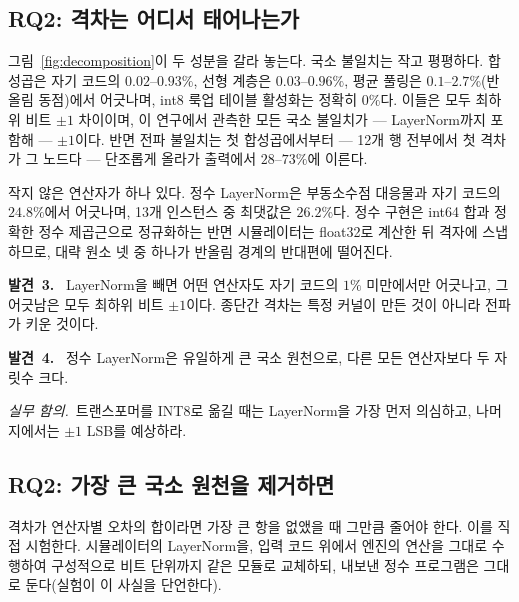 \documentclass[journal]{IEEEtran}
\newcommand{\finding}[1]{\smallskip\noindent\textbf{발견~#1.}~}
\newcommand{\implication}{\emph{실무 함의.}~}
\begin{document}
\subsection{RQ2: 격차는 어디서 태어나는가}
그림~\ref{fig:decomposition}이 두 성분을 갈라 놓는다. 국소 불일치는 작고 평평하다. 합성곱은 자기 코드의
$0.02$--$0.93\%$, 선형 계층은 $0.03$--$0.96\%$, 평균 풀링은 $0.1$--$2.7\%$(반올림 동점)에서 어긋나며, int8 룩업
테이블 활성화는 정확히 $0\%$다. 이들은 모두 최하위 비트 $\pm 1$ 차이이며, 이 연구에서 관측한 모든 국소 불일치가 --- LayerNorm까지
포함해 --- $\pm 1$이다. 반면 전파 불일치는 첫
합성곱에서부터 --- 12개 행 전부에서 첫 격차가 그 노드다 --- 단조롭게 올라가 출력에서 $28$--$73\%$에 이른다.

작지 않은 연산자가 하나 있다. 정수 LayerNorm은 부동소수점 대응물과 자기 코드의 $24.8\%$에서 어긋나며, 13개
인스턴스 중 최댓값은 $26.2\%$다. 정수 구현은 int64 합과 정확한 정수 제곱근으로 정규화하는 반면 시뮬레이터는
float32로 계산한 뒤 격자에 스냅하므로, 대략 원소 넷 중 하나가 반올림 경계의 반대편에 떨어진다.

\finding{3} LayerNorm을 빼면 어떤 연산자도 자기 코드의 $1\%$ 미만에서만 어긋나고, 그 어긋남은 모두 최하위 비트
$\pm 1$이다. 종단간 격차는 특정 커널이 만든 것이 아니라 전파가 키운 것이다.

\finding{4} 정수 LayerNorm은 유일하게 큰 국소 원천으로, 다른 모든 연산자보다 두 자릿수 크다.

\implication 트랜스포머를 INT8로 옮길 때는 LayerNorm을 가장 먼저 의심하고, 나머지에서는 $\pm 1$ LSB를 예상하라.

\begin{table}[!t]
\caption{시뮬레이터의 LayerNorm을 정수에 충실하게 바꾼 결과(ViT-128/6, $10{,}000$장). 각 방식의 두 행 사이에서 정수
프로그램은 바뀌지 않았고 시뮬레이터의 LayerNorm만 다르다. 로짓 절대차 평균은 \textsc{pc}에서 $0.119 \rightarrow 0.091$,
\textsc{pt}에서 $0.118 \rightarrow 0.093$으로 줄어든다.}
\label{tab:layernorm}
\centering
\footnotesize

\end{table}

\subsection{RQ2: 가장 큰 국소 원천을 제거하면}
격차가 연산자별 오차의 합이라면 가장 큰 항을 없앴을 때 그만큼 줄어야 한다. 이를 직접 시험한다. 시뮬레이터의
LayerNorm을, 입력 코드 위에서 엔진의 연산을 그대로 수행하여 구성적으로 비트 단위까지 같은 모듈로 교체하되,
내보낸 정수 프로그램은 그대로 둔다(실험이 이 사실을 단언한다).
\end{document}
